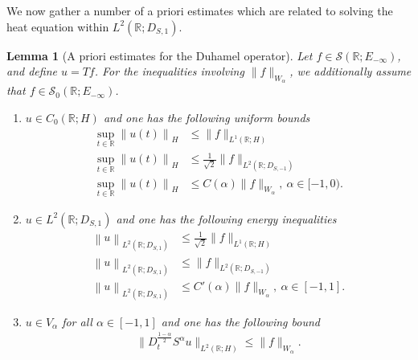 \documentclass[11pt, letterpaper]{amsart}
\newtheorem{lem}[thm]{Lemma}
\theoremstyle{definition}
\theoremstyle{remark}
\numberwithin{equation}{section}
\begin{document}
    We now gather a number of  a priori estimates  which are related to solving the heat equation  within $L^2(\mathbb{R};D_{S,1})$.

\begin{lem}[A priori estimates for the Duhamel operator] \label{lem:aprioriestimates} 
Let $ f \in \mathcal{S}(\mathbb{R}; E_{-\infty}) $, and define $ u = Tf $. For the inequalities involving $ \|f\|_{W_\alpha} $, we additionally assume that $ f \in \mathcal{S}_0(\mathbb{R}; E_{-\infty})$. 
    
    \begin{enumerate} \item $u\in C_0(\mathbb{R}; H)$ and one has the following uniform bounds
        \begin{align*}\sup_{t \in \mathbb{R}} \left\| u(t)\right\|_H &\le \|f\|_{L^1(\mathbb{R};H)}\\
            \sup_{t \in \mathbb{R}} \left\| u(t)\right\|_H  &\le \frac{1}{\sqrt{2}} \|f \|_{L^2(\mathbb{R}; D_{S,-1})}\\
            \sup_{t \in \mathbb{R}} \left\| u(t)\right\|_H &\le C(\alpha) \|f\|_{W_\alpha}, \ \alpha\in [-1,0).
        \end{align*} 
        \item  $u \in L^2(\mathbb{R};D_{S,1})$ and one has the following energy inequalities
        \begin{align*}\left\|u \right\|_{L^2(\mathbb{R}; D_{S,1})} &\le \frac{1}{\sqrt{2}} \|f\|_{L^1(\mathbb{R};H)}\\
            \left\|u \right\|_{L^2(\mathbb{R}; D_{S,1})}  &\le  \|f \|_{L^2(\mathbb{R}; D_{S,-1})}\\
            \left\|u \right\|_{L^2(\mathbb{R}; D_{S,1})} &\le C'(\alpha) \|f\|_{W_\alpha}, \ \alpha\in [-1,1].
        \end{align*} 
        \item  $u \in V_\alpha$ for all $\alpha\in [-1,1]$ and one has the following bound
        \begin{align*}\|D_t^{\frac{1-\alpha}{2}}S^\alpha u\|_{L^2(\mathbb{R};H)}  \le  \|f\|_{W_\alpha}.
        \end{align*} 
         
            \end{enumerate}
        
\end{lem}
\end{document}
